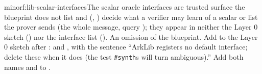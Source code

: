 \begin{finding}{minor}{f:lib-scalar-interfaces}{The scalar oracle interfaces are trusted surface the blueprint does not list}
  and 
(\allowbreak{}, ) decide what a verifier may learn of a scalar or list
the prover sends (the whole message, query \lean{()}); they appear in neither the Layer 0 sketch
() nor the interface list ().
 An omission of the blueprint.
 Add to the Layer 0 sketch after :
and
,
with the sentence \enquote{ArkLib registers no default interface; delete these when it does (the
test \texttt{\#synth}s will turn ambiguous).} Add both names and  to
.
\end{finding}

